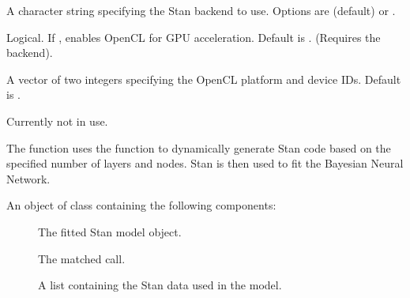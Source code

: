 \documentclass[a4paper]{book}
\begin{document}
\begin{Arguments}
\begin{ldescription}
\item[\code{backend}] A character string specifying the Stan backend to use. Options are  (default) or .

\item[\code{use\_gpu}] Logical. If , enables OpenCL for GPU acceleration. Default is . (Requires the  backend).

\item[\code{opencl\_ids}] A vector of two integers specifying the OpenCL platform and device IDs. Default is .

\item[\code{...}] Currently not in use.
\end{ldescription}
\end{Arguments}
%
\begin{Details}
The function uses the  function to dynamically generate Stan code based on the specified number of layers and nodes. Stan is then used to fit the Bayesian Neural Network.
\end{Details}
%
\begin{Value}
An object of class  containing the following components:
\begin{description}

\item[] The fitted Stan model object.
\item[] The matched call.
\item[] A list containing the Stan data used in the model.

\end{description}

\end{Value}
%
\begin{SeeAlso}
\end{SeeAlso}
%
\begin{Examples}
\end{Examples}
\end{document}
